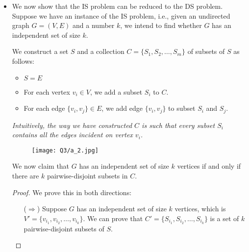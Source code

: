 \documentclass[11pt, fleqn]{article}
\begin{document}
\begin{itemize}
\begin{proof}
\begin{itemize}
            Consider an arbitrary pair of distinct sets $S_{i_x}$ and $S_{i_y}$. Suppose they are not pairwise-disjoint, i.e., $S_{i_x} \cap S_{i_y} \neq \phi$. This implies there is an edge connecting $v_{i_x}$ and $v_{i_y}$ in $G$, by the way in which $G$ was constructed. But this contradicts the fact that both $v_{i_x}$ and $v_{i_y}$ belong to the independent set $V'$. Thus, $S_{i_x}$ and $S_{i_y}$ must be pairwise-disjoint.
            
            Since $x$ and $y$ were arbitrary, the set $C'$ must consist of $k$ pairwise-disjoint subsets of $S$.
        \end{itemize}
    \end{proof}
    With this, we conclude that the DS problem can be reduced to the independent set problem.
    
    \item
    We now show that the IS problem can be reduced to the DS problem. Suppose we have an instance of the IS problem, i.e., given an undirected graph $G = (V, E)$ and a number $k$, we intend to find whether $G$ has an independent set of size $k$.
    
    We construct a set $S$ and a collection $C = \{S_1, S_2, \dots, S_m\}$ of subsets of $S$ as follows:
    \begin{itemize}
        \item $S = E$
        \item For each vertex $v_i \in V$, we add a subset $S_i$ to $C$.
        \item For each edge $\{v_i, v_j\} \in E$, we add edge $\{v_i, v_j\}$ to subset $S_i$ and $S_j$.
    \end{itemize}
    \textit{Intuitively, the way we have constructed $C$ is such that every subset $S_i$ contains all the edges incident on vertex $v_i$.}
     \begin{figure}[H]
        \texttt{[image: Q3/a\_2.jpg]}
    \end{figure}
    
    We now claim that $G$ has an independent set of size $k$ vertices if and only if there are $k$ pairwise-disjoint subsets in $C$.
    \begin{proof}
        We prove this in both directions:
        \begin{itemize}
            \item[($\Rightarrow$)]
            Suppose $G$ has an independent set of size $k$ vertices, which is $V' = \{v_{i_1}, v_{i_2}, \dots, v_{i_k}\}$. We can prove that $C' = \{S_{i_1}, S_{i_2}, \dots, S_{i_k}\}$ is a set of $k$ pairwise-disjoint subsets of $S$.
            

\end{itemize}
\end{proof}
\end{itemize}
\end{document}
